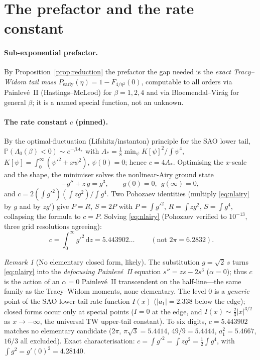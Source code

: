 \documentclass[11pt]{article}
\theoremstyle{remark}
\newtheorem*{remark}{Remark}
\newcommand{\dd}{\,\mathrm{d}}
\newcommand{\Pearly}{P_{\mathrm{early}}}
\begin{document}
\section{The prefactor and the rate constant}\label{sec:prefactor}

\paragraph{Sub-exponential prefactor.} By Proposition~\ref{prop:reduction} the
prefactor the gap needed is the \emph{exact Tracy--Widom tail mass}
$\Pearly(\eta)=1-F_{4/\eta^2}(0)$, computable to all orders via Painlev\'e~II
(Hastings--McLeod) for $\beta=1,2,4$ and via Bloemendal--Vir\'ag for general $\beta$;
it is a named special function, not an unknown.

\paragraph{The rate constant $c$ (pinned).} By the optimal-fluctuation
(Lifshitz/instanton) principle for the SAO lower tail,
$\mathbb P(\Lambda_0(\beta)<0)\sim e^{-\beta A_*}$ with
$A_*=\tfrac18\min_\psi K[\psi]^2/\!\int\psi^4$, $K[\psi]=\int_0^\infty(\psi'^2+x\psi^2)$,
$\psi(0)=0$; hence $c=4A_*$. Optimising the $x$-scale and the shape, the minimiser
solves the nonlinear-Airy ground state
\begin{equation}\label{eq:nlairy}
  -g'' + z\,g = g^3,\qquad g(0)=0,\ \ g(\infty)=0,
\end{equation}
and $c=2(\int g'^2)(\int z g^2)/\!\int g^4$. Two Pohozaev identities (multiply
\eqref{eq:nlairy} by $g$ and by $z g'$) give $P=R$, $S=2P$ with $P=\int g'^2$,
$R=\int z g^2$, $S=\int g^4$, collapsing the formula to $c=P$. Solving \eqref{eq:nlairy}
(Pohozaev verified to $10^{-13}$, three grid resolutions agreeing):
\begin{equation}\label{eq:cval}
  \boxed{\;c = \int_0^\infty g'^2\dd z = 5.443902\ldots\;}\qquad(\text{not }2\pi=6.2832).
\end{equation}

\begin{remark}[No elementary closed form, likely]
The substitution $g=\sqrt2\,s$ turns \eqref{eq:nlairy} into the \emph{defocusing
Painlev\'e~II} equation $s''=zs-2s^3$ ($\alpha=0$); thus $c$ is the action of an
$\alpha=0$ Painlev\'e~II transcendent on the half-line---the same family as the
Tracy--Widom moments, none elementary. The level $0$ is a \emph{generic} point of the
SAO lower-tail rate function $I(x)$ ($|a_1|=2.338$ below the edge); closed forms occur
only at special points ($I=0$ at the edge, and $I(x)\sim\tfrac23|x|^{3/2}$ as
$x\to-\infty$, the universal TW upper-tail constant). To six digits, $c=5.443902$
matches no elementary candidate ($2\pi$, $\pi\sqrt3=5.4414$, $49/9=5.4444$,
$a_1^2=5.4667$, $16/3$ all excluded). Exact characterisation:
$c=\int g'^2=\int z g^2=\tfrac12\int g^4$, with $\int g^2=g'(0)^2=4.28140$.
\end{remark}
\end{document}
